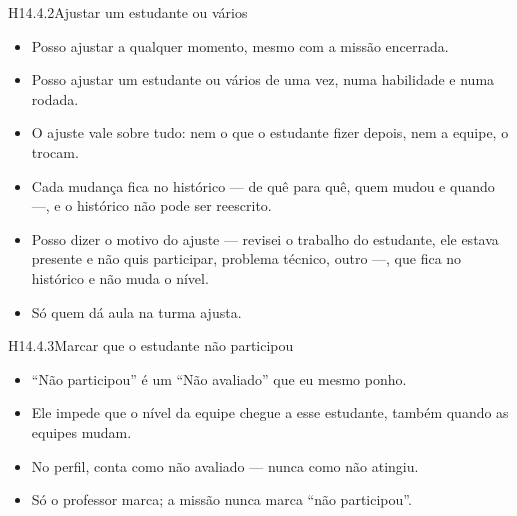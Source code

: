 \begin{historia}{H14.4.2}{Ajustar um estudante ou vários}{\parcial}
\aceite
\begin{itemize}
  \item Posso ajustar a qualquer momento, mesmo com a missão encerrada.
  \item Posso ajustar um estudante ou vários de uma vez, numa habilidade e numa
    rodada.
  \item O ajuste vale sobre tudo: nem o que o estudante fizer depois, nem a
    equipe, o trocam.
  \item Cada mudança fica no histórico --- de quê para quê, quem mudou e quando
    ---, e o histórico não pode ser reescrito.
  \item Posso dizer o motivo do ajuste --- revisei o trabalho do estudante, ele
    estava presente e não quis participar, problema técnico, outro ---, que
    fica no histórico e não muda o nível.
  \item Só quem dá aula na turma ajusta.
\end{itemize}
\end{historia}

\begin{historia}{H14.4.3}{Marcar que o estudante não participou}{\parcial}
\aceite
\begin{itemize}
  \item \enquote{Não participou} é um \enquote{Não avaliado} que eu mesmo
    ponho.
  \item Ele impede que o nível da equipe chegue a esse estudante, também quando
    as equipes mudam.
  \item No perfil, conta como não avaliado --- nunca como não atingiu.
  \item Só o professor marca; a missão nunca marca \enquote{não participou}.
\end{itemize}
\end{historia}

